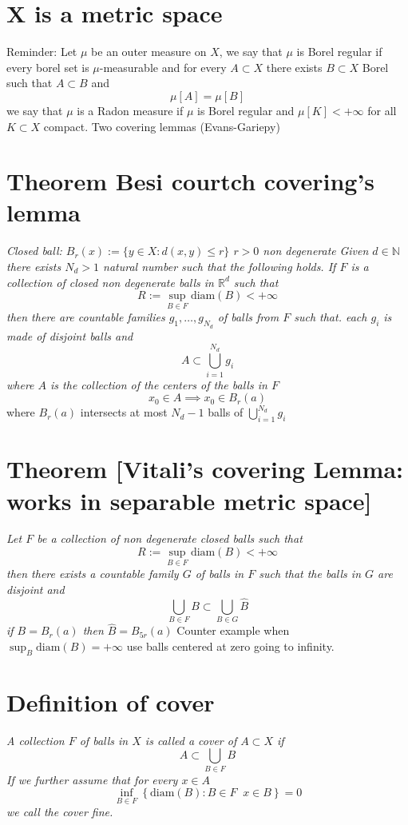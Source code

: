 \documentclass[11pt]{article}
\begin{document}
\section{X is a metric space}
Reminder: Let $ \mu $ be an outer measure on $X$, we say that  $\mu$ is Borel regular if every borel set is $\mu$-measurable and 
for every $A \subset X$ there exists $ B \subset X$ Borel such that $A \subset B$ and
\[
    \mu[A] = \mu[B]
\] 
we say that $ \mu $ is a Radon measure if $\mu$ is Borel regular and $\mu[K] < +\infty$ for all $ K \subset  X $ compact. Two covering lemmas (Evans-Gariepy)

\section{Theorem Besi courtch covering's lemma}
\emph{
    Closed ball: $B_r(x) := \{y \in X: d(x,y) \le r\}$  $r > 0$ non degenerate
}
\emph{
    Given $d \in \mathbb{N}$ there exists $ N_d > 1$ natural number such that the following holds.
    If  $F$ is a collection of closed non degenerate balls in $ \mathbb{R}^{d}$ such that
     \[
          R := \sup_{B \in F} \text{diam}(B) < +\infty
    \] 
    then there are countable families $g_1, \dots, g_{N_d}$ of balls from $F$ such that.
    each  $g_i$ is made of disjoint balls and 
     \[
         A \subset \bigcup_{i=1}^{N_d}g_i
    \] 
    where $A$ is the collection of the centers of the balls in $ F$
}
\[
    x_0 \in A \implies x_0 \in B_r(a)
\] 
where $ B_r(a)$ intersects  at most $N_d - 1$ balls of  $\bigcup_{i=1}^{N_d}g_i$

\section{Theorem [Vitali's covering Lemma: works in separable metric space]}
\emph{
    Let $F$ be a collection of non degenerate closed balls such that
    \[
        R := \sup_{B \in F}\text{diam}(B) < +\infty
    \] 
    then there exists a countable family $G$ of balls in $F$ such that 
    the balls in $G$ are disjoint and
     \[
         \bigcup_{B \in F} B \subset \bigcup_{B \in G} \hat B
    \] 
    if $B = B_r(a)$ then $\hat B = B_{5r}(a)$
}
Counter example when $\sup_{B} \text{diam}(B) = +\infty$ use balls centered at zero going to infinity.

\section{Definition of cover}
\emph{
    A collection  $F$ of balls in  $X$ is called  a cover of $A \subset X$ if 
    \[
        A \subset \bigcup_{B \in F} B
    \] 
    If we further assume that for every $x \in A$
     \[
         \inf_{B \in F}\left\{ \text{diam}(B) : B \in F \;\; x \in B \right\} = 0
    \] 
    we call the cover fine.
}
\end{document}
